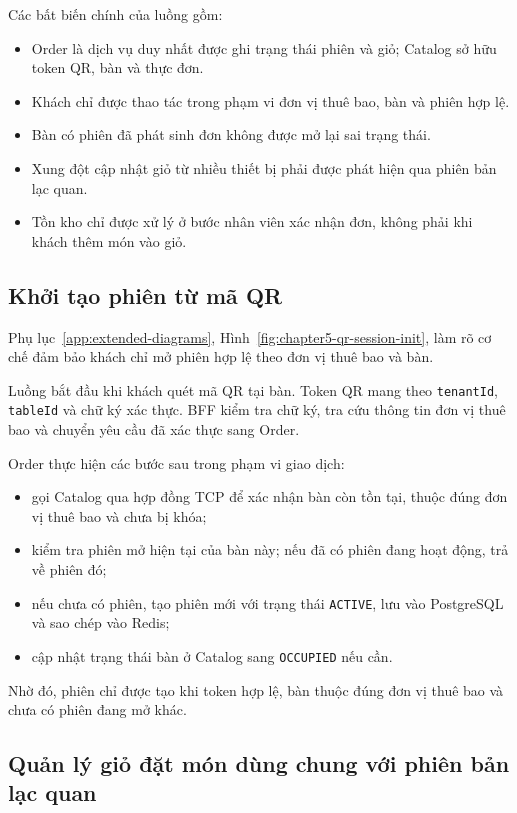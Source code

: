 Các bất biến chính của luồng gồm:

\begin{itemize}
  \item Order là dịch vụ duy nhất được ghi trạng thái phiên và giỏ; Catalog sở hữu token QR, bàn và thực đơn.
  \item Khách chỉ được thao tác trong phạm vi đơn vị thuê bao, bàn và phiên hợp lệ.
  \item Bàn có phiên đã phát sinh đơn không được mở lại sai trạng thái.
  \item Xung đột cập nhật giỏ từ nhiều thiết bị phải được phát hiện qua phiên bản lạc quan.
  \item Tồn kho chỉ được xử lý ở bước nhân viên xác nhận đơn, không phải khi khách thêm món vào giỏ.
\end{itemize}

\subsection{Khởi tạo phiên từ mã QR}

Phụ lục~\ref{app:extended-diagrams}, Hình~\ref{fig:chapter5-qr-session-init}, làm rõ cơ chế đảm bảo khách chỉ mở phiên hợp lệ theo đơn vị thuê bao và bàn.

Luồng bắt đầu khi khách quét mã QR tại bàn. Token QR mang theo \texttt{tenantId}, \texttt{tableId} và chữ ký xác thực. BFF kiểm tra chữ ký, tra cứu thông tin đơn vị thuê bao và chuyển yêu cầu đã xác thực sang Order.

Order thực hiện các bước sau trong phạm vi giao dịch:

\begin{itemize}
  \item gọi Catalog qua hợp đồng TCP để xác nhận bàn còn tồn tại, thuộc đúng đơn vị thuê bao và chưa bị khóa;
  \item kiểm tra phiên mở hiện tại của bàn này; nếu đã có phiên đang hoạt động, trả về phiên đó;
  \item nếu chưa có phiên, tạo phiên mới với trạng thái \texttt{ACTIVE}, lưu vào PostgreSQL và sao chép vào Redis;
  \item cập nhật trạng thái bàn ở Catalog sang \texttt{OCCUPIED} nếu cần.
\end{itemize}

Nhờ đó, phiên chỉ được tạo khi token hợp lệ, bàn thuộc đúng đơn vị thuê bao và chưa có phiên đang mở khác.

\subsection{Quản lý giỏ đặt món dùng chung với phiên bản lạc quan}

